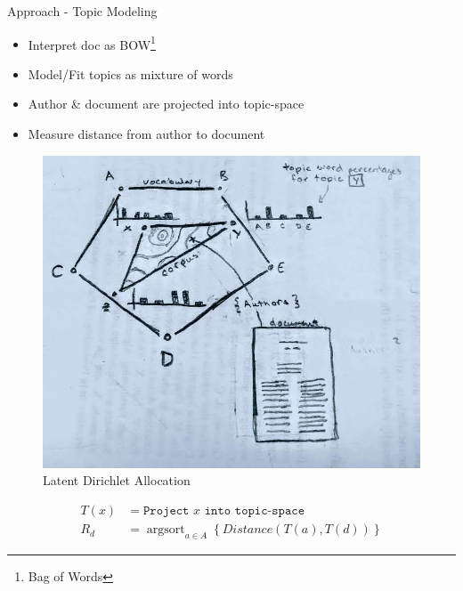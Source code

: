 \documentclass[10pt]{beamer}
\DeclareMathOperator*{\argsort}{argsort}
\begin{document}
\begin{frame}{Approach - Topic Modeling}


  \begin{multicols}{2}

  \begin{itemize}
  \item Interpret doc as BOW\footnote{Bag of Words}
  \item Model/Fit topics as mixture of words
  \item Author \& document are projected into topic-space
  \item Measure distance from author to document
  \end{itemize}

  \begin{figure}
  \includegraphics[width=\columnwidth]{./lda-draw.jpg}
  \caption{Latent Dirichlet Allocation}
  \end{figure}

  \end{multicols}

  \begin{align*}
    T(x) &= \texttt{Project $x$ into topic-space} \\
    R_d &= \argsort_{a\in A} \left\{Distance(T(a),T(d))\right\}
  \end{align*}

\end{frame}
\end{document}

